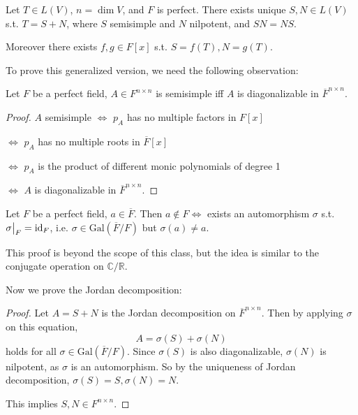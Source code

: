 \begin{theorem}
    Let $T\in L(V)$, $n = \dim V$, and $F$ is perfect.
	There exists unique $S,N\in L(V)$ s.t. $T = S+N$, where $S$ semisimple and
	$N$ nilpotent, and $SN = NS$.

	Moreover there exists $f,g\in F[x]$ s.t. $S = f(T), N = g(T)$.
\end{theorem}

To prove this generalized version, we need the following observation:
\begin{proposition}
	Let $F$ be a perfect field, $A\in F^{n\times n}$ is semisimple
	iff $A$ is diagonalizable in $\overline{F}^{n\times n}$.
\end{proposition}
\begin{proof}[Proof]
	$A$ semisimple $\iff$ $p_A$ has no multiple factors in $F[x]$

	$\iff$ $p_A$ has no multiple roots in $\overline{F}[x]$

	$\iff$ $p_A$ is the product of different monic polynomials of degree 1

	$\iff$ $A$ is diagonalizable in $\overline{F}^{n\times n}$.
\end{proof}

\begin{proposition}
	Let $F$ be a perfect field, $a\in \overline{F}$.
	Then $a\notin F\iff$ exists an automorphism $\sigma$ s.t. $\sigma\big|_F = \operatorname{id}_F$,
	i.e. $\sigma\in \mathrm{Gal}(\overline{F}/F)$ but $\sigma(a)\ne a$.
\end{proposition}
\begin{remark}
    This proof is beyond the scope of this class, but the idea is similar
	to the conjugate operation on $ \mathbb{C}/\mathbb{R}$.
\end{remark}

Now we prove the Jordan decomposition:
\begin{proof}[Proof]
    Let $A = S + N$ is the Jordan decomposition on $\overline{F}^{n\times n}$.
	Then by applying $\sigma$ on this equation,
	\[
	A = \sigma(S) + \sigma(N)
	\]
	holds for all $\sigma\in \mathrm{Gal}(\overline{F}/F)$.
	Since $\sigma(S)$ is also diagonalizable, $\sigma(N)$ is nilpotent,
	as $\sigma$ is an automorphism.
	So by the uniqueness of Jordan decomposition, $\sigma(S)=S, \sigma(N)=N$.

	This implies $S, N \in F^{n \times n}$.
\end{proof}

